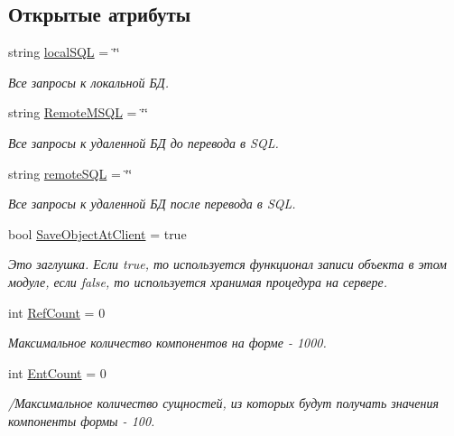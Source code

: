 \subsection*{Открытые атрибуты}
\begin{DoxyCompactItemize}
\item 
string \mbox{\hyperlink{class_f_b_a_1_1_object_ref_ae5b0fc12db21dfe4dc0a1f90deb5d5f2}{local\+S\+QL}} = \char`\"{}\char`\"{}
\begin{DoxyCompactList}\small\item\em Все запросы к локальной БД. \end{DoxyCompactList}\item 
string \mbox{\hyperlink{class_f_b_a_1_1_object_ref_a61bc291f53591afb6cdd4a43e9ac9b49}{Remote\+M\+S\+QL}} = \char`\"{}\char`\"{}
\begin{DoxyCompactList}\small\item\em Все запросы к удаленной БД до перевода в S\+QL. \end{DoxyCompactList}\item 
string \mbox{\hyperlink{class_f_b_a_1_1_object_ref_a16579d6053e661a4cd48d973386524cd}{remote\+S\+QL}} = \char`\"{}\char`\"{}
\begin{DoxyCompactList}\small\item\em Все запросы к удаленной БД после перевода в S\+QL. ~\newline
\end{DoxyCompactList}\item 
bool \mbox{\hyperlink{class_f_b_a_1_1_object_ref_af9c252926768a61635f5f50a439f37ae}{Save\+Object\+At\+Client}} = true
\begin{DoxyCompactList}\small\item\em Это заглушка. Если true, то используется функционал записи объекта в этом модуле, если false, то используется хранимая процедура на сервере. \end{DoxyCompactList}\item 
int \mbox{\hyperlink{class_f_b_a_1_1_object_ref_acf527bcb6dced4b9a736eb0eeefc6ecc}{Ref\+Count}} = 0
\begin{DoxyCompactList}\small\item\em Максимальное количество компонентов на форме -\/ 1000. \end{DoxyCompactList}\item 
int \mbox{\hyperlink{class_f_b_a_1_1_object_ref_adbdded634ccfc383ecaad883519741cf}{Ent\+Count}} = 0
\begin{DoxyCompactList}\small\item\em /Максимальное количество сущностей, из которых будут получать значения компоненты формы -\/ 100. \end{DoxyCompactList}\item 

\end{DoxyCompactItemize}

